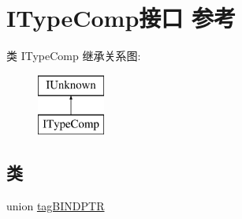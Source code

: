 \hypertarget{interface_i_type_comp}{}\section{I\+Type\+Comp接口 参考}
\label{interface_i_type_comp}
类 I\+Type\+Comp 继承关系图\+:\begin{figure}[H]
\begin{center}
\leavevmode
\includegraphics[height=2.000000cm]{interface_i_type_comp}
\end{center}
\end{figure}
\subsection*{类}
\begin{DoxyCompactItemize}
\item 
union \hyperlink{union_i_type_comp_1_1tag_b_i_n_d_p_t_r}{tag\+B\+I\+N\+D\+P\+TR}
\end{DoxyCompactItemize}
